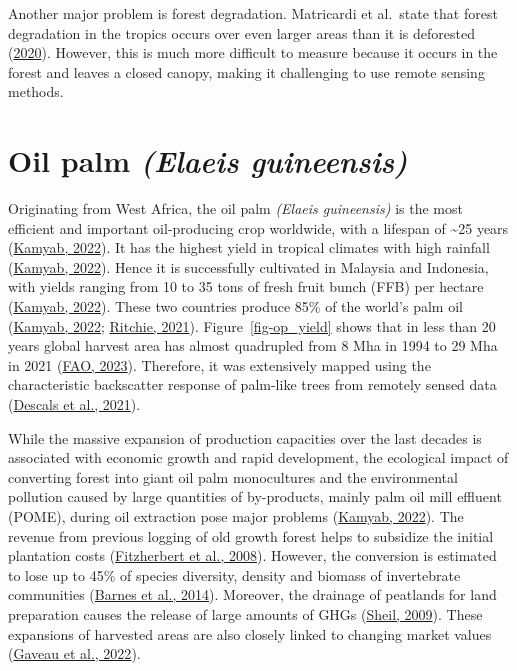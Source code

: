 \documentclass[
  letterpaper,
  DIV=11,
  numbers=noendperiod]{scrreprt}
\begin{document}
Another major problem is forest degradation. Matricardi et al.~state
that forest degradation in the tropics occurs over even larger areas
than it is deforested
(\protect\hyperlink{ref-matricardiLongtermForestDegradation2020}{2020}).
However, this is much more difficult to measure because it occurs in the
forest and leaves a closed canopy, making it challenging to use remote
sensing methods.

\hypertarget{sec-oilpalm}{%
\section{\texorpdfstring{Oil palm \emph{(Elaeis
guineensis)}}{Oil palm (Elaeis guineensis)}}\label{sec-oilpalm}}

Originating from West Africa, the oil palm \emph{(Elaeis guineensis)} is
the most efficient and important oil-producing crop worldwide, with a
lifespan of \textasciitilde25 years
(\protect\hyperlink{ref-kamyabElaeisGuineensis2022}{Kamyab, 2022}). It
has the highest yield in tropical climates with high rainfall
(\protect\hyperlink{ref-kamyabElaeisGuineensis2022}{Kamyab, 2022}).
Hence it is successfully cultivated in Malaysia and Indonesia, with
yields ranging from 10 to 35 tons of fresh fruit bunch (FFB) per hectare
(\protect\hyperlink{ref-kamyabElaeisGuineensis2022}{Kamyab, 2022}).
These two countries produce 85\% of the world's palm oil
(\protect\hyperlink{ref-kamyabElaeisGuineensis2022}{Kamyab, 2022};
\protect\hyperlink{ref-ritchiePalmOil2021}{Ritchie, 2021}).
Figure~\ref{fig-op_yield} shows that in less than 20 years global
harvest area has almost quadrupled from 8 Mha in 1994 to 29 Mha in 2021
(\protect\hyperlink{ref-faoFAOSTATDatabase2023}{FAO, 2023}). Therefore,
it was extensively mapped using the characteristic backscatter response
of palm-like trees from remotely sensed data
(\protect\hyperlink{ref-descalsHighresolutionGlobalMap2021}{Descals et
al., 2021}).

While the massive expansion of production capacities over the last
decades is associated with economic growth and rapid development, the
ecological impact of converting forest into giant oil palm monocultures
and the environmental pollution caused by large quantities of
by-products, mainly palm oil mill effluent (POME), during oil extraction
pose major problems
(\protect\hyperlink{ref-kamyabElaeisGuineensis2022}{Kamyab, 2022}). The
revenue from previous logging of old growth forest helps to subsidize
the initial plantation costs
(\protect\hyperlink{ref-fitzherbertHowWillOil2008}{Fitzherbert et al.,
2008}). However, the conversion is estimated to lose up to 45\% of
species diversity, density and biomass of invertebrate communities
(\protect\hyperlink{ref-barnesConsequencesTropicalLand2014}{Barnes et
al., 2014}). Moreover, the drainage of peatlands for land preparation
causes the release of large amounts of GHGs
(\protect\hyperlink{ref-sheilImpactsOpportunitiesOil2009}{Sheil, 2009}).
These expansions of harvested areas are also closely linked to changing
market values
(\protect\hyperlink{ref-gaveauSlowingDeforestationIndonesia2022}{Gaveau
et al., 2022}).
\end{document}
